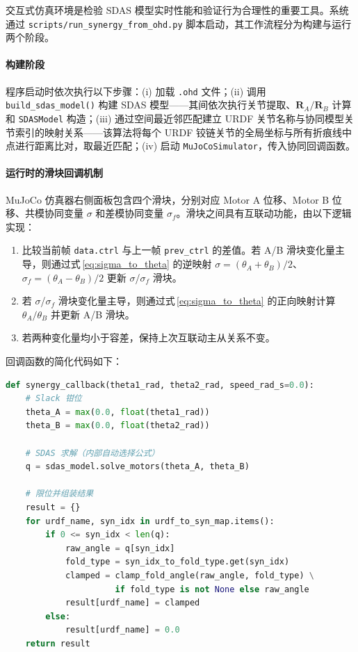 \documentclass[12pt,a4paper]{report}
\begin{document}
交互式仿真环境是检验 SDAS 模型实时性能和验证行为合理性的重要工具。系统通过 \lstinline{scripts/run_synergy_from_ohd.py} 脚本启动，其工作流程分为构建与运行两个阶段。

\paragraph{构建阶段}

程序启动时依次执行以下步骤：(i) 加载 \lstinline{.ohd} 文件；(ii) 调用 \lstinline{build_sdas_model()} 构建 SDAS 模型——其间依次执行关节提取、$\mathbf{R}_A/\mathbf{R}_B$ 计算和 \lstinline{SDASModel} 构造；(iii) 通过空间最近邻匹配建立 URDF 关节名称与协同模型关节索引的映射关系——该算法将每个 URDF 铰链关节的全局坐标与所有折痕线中点进行距离比对，取最近匹配；(iv) 启动 \lstinline{MuJoCoSimulator}，传入协同回调函数。

\paragraph{运行时的滑块回调机制}

MuJoCo 仿真器右侧面板包含四个滑块，分别对应 Motor A 位移、Motor B 位移、共模协同变量 $\sigma$ 和差模协同变量 $\sigma_f$。滑块之间具有互联动功能，由以下逻辑实现：

\begin{enumerate}
    \item 比较当前帧 \lstinline{data.ctrl} 与上一帧 \lstinline{prev_ctrl} 的差值。若 A/B 滑块变化量主导，则通过式\,\eqref{eq:sigma_to_theta} 的逆映射 $\sigma = (\theta_A + \theta_B)/2$、$\sigma_f = (\theta_A - \theta_B)/2$ 更新 $\sigma$/$\sigma_f$ 滑块。
    \item 若 $\sigma$/$\sigma_f$ 滑块变化量主导，则通过式\,\eqref{eq:sigma_to_theta} 的正向映射计算 $\theta_A/\theta_B$ 并更新 A/B 滑块。
    \item 若两种变化量均小于容差，保持上次互联动主从关系不变。
\end{enumerate}

回调函数的简化代码如下：

\begin{lstlisting}[language=Python, caption=仿真器协同回调函数的核心逻辑]
def synergy_callback(theta1_rad, theta2_rad, speed_rad_s=0.0):
    # Slack 钳位
    theta_A = max(0.0, float(theta1_rad))
    theta_B = max(0.0, float(theta2_rad))

    # SDAS 求解（内部自动选择公式）
    q = sdas_model.solve_motors(theta_A, theta_B)

    # 限位并组装结果
    result = {}
    for urdf_name, syn_idx in urdf_to_syn_map.items():
        if 0 <= syn_idx < len(q):
            raw_angle = q[syn_idx]
            fold_type = syn_idx_to_fold_type.get(syn_idx)
            clamped = clamp_fold_angle(raw_angle, fold_type) \
                      if fold_type is not None else raw_angle
            result[urdf_name] = clamped
        else:
            result[urdf_name] = 0.0
    return result
\end{lstlisting}
\end{document}
